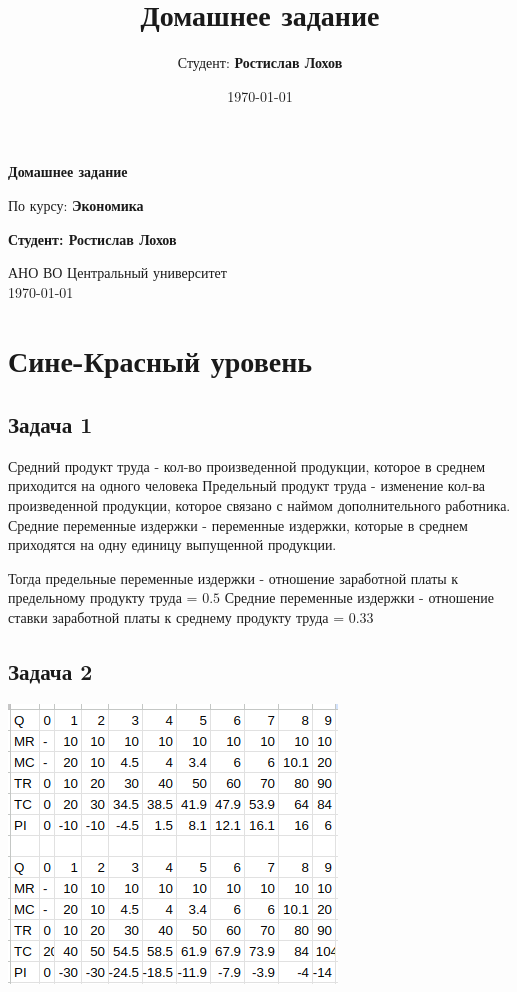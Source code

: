 \documentclass[a4paper,12pt]{article}
\title{Домашнее задание}
\author{Студент: \textbf{Ростислав Лохов}}
\date{\today}
\begin{document}
\begin{titlepage}
    \centering
    \vspace*{1cm}

    \Huge
    \textbf{Домашнее задание}

    \vspace{0.5cm}
    \LARGE
    По курсу: \textbf{Экономика}

    \vspace{1.5cm}

    \textbf{Студент: Ростислав Лохов}

    \vfill

    \Large
    АНО ВО Центральный университет\\
    \vspace{0.3cm}
    \today

\end{titlepage}

\tableofcontents
\newpage

\section{Сине-Красный уровень}


\subsection{Задача 1}
Средний продукт труда - кол-во произведенной продукции, которое в среднем приходится на одного человека
Предельный продукт труда - изменение кол-ва произведенной продукции, которое связано с наймом дополнительного работника.
Средние переменные издержки - переменные издержки, которые в среднем приходятся на одну единицу выпущенной продукции.

Тогда предельные переменные издержки - отношение заработной платы к предельному продукту труда = $0.5$
Средние переменные издержки - отношение ставки заработной платы к среднему продукту труда = $0.33$

\subsection{Задача 2}
\includegraphics[scale=0.55]{graphs/6.1.png}
\end{document}

